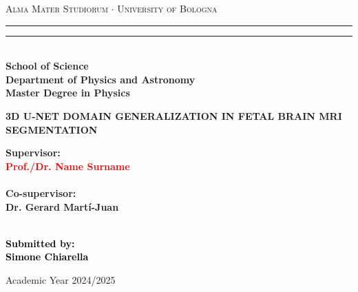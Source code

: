 \documentclass[12pt,a4paper]{report}
\begin{document}
\begin{titlepage}
%
%
%
%
\begin{center}
{{\Large{\textsc{Alma Mater Studiorum $\cdot$ University of  Bologna}}}} 
\rule[0.1cm]{15.8cm}{0.1mm}
\rule[0.5cm]{15.8cm}{0.6mm}
\\\vspace{3mm}
{\small{\bfseries School of Science \\
Department of Physics and Astronomy\\
Master Degree in Physics}}
\end{center}

\vspace{23mm}

\begin{center}
%
%
\begin{spacing}{2}
{\LARGE{\bfseries 3D U-NET DOMAIN GENERALIZATION IN FETAL BRAIN MRI SEGMENTATION}}\\
\end{spacing}
\end{center}

\vspace{35mm} \par \noindent

\begin{minipage}[t]{0.47\textwidth}
%
%
{\large{\bfseries Supervisor: \vspace{2mm}\\\textcolor{red}{
Prof./Dr. Name Surname}\\\\
%
%
%
\bfseries Co-supervisor:
\vspace{2mm}\\
Dr. Gerard Martí-Juan\\\\}}
\end{minipage}
%
\hfill
%
\begin{minipage}[t]{0.47\textwidth}\raggedleft \textcolor{black}{
{\large{\bfseries Submitted by:
\vspace{2mm}\\
%
%
Simone Chiarella}}}

\end{minipage}

\vspace{20mm}

\begin{center}
%
%
Academic Year 2024/2025
\end{center}

\end{titlepage}
\end{document}

